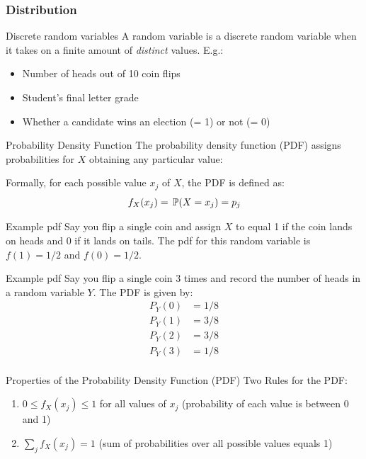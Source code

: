 \documentclass[aspectratio=169,t,11pt,table]{beamer}
\begin{document}
\subsubsection*{Distribution}

\begin{frame}{Discrete random variables}
  A random variable is a \alert{discrete random variable} when it takes on a finite amount of \emph{distinct} values. E.g.:
  \begin{itemize}
    \item Number of heads out of 10 coin flips
    
    \item Student's final letter grade

    \item Whether a candidate wins an election (= 1) or not (= 0)
  \end{itemize}
\end{frame}

\begin{frame}{Probability Density Function}
  The \alert{probability density function} (PDF) assigns probabilities for $X$ obtaining any particular value:
  
  \bigskip 
  Formally, for each possible value $x_j$ of $X$, the PDF is defined as:
  $$
    f_{X}(x_j) = \P{X = x_j} = p_j
  $$
\end{frame}

\begin{frame}{Example pdf}
  Say you flip a single coin and assign $X$ to equal 1 if the coin lands on heads and 0 if it lands on tails. 
  \bigskip
  The pdf for this random variable is $f(1) = 1/2$ and $f(0) = 1/2$.
\end{frame}

\begin{frame}{Example pdf}
  Say you flip a single coin 3 times and record the number of heads in a random variable $Y$. The PDF is given by:
  \begin{align*}
    P_Y(0) &= 1/8 \\
    P_Y(1) &= 3/8 \\
    P_Y(2) &= 3/8 \\
    P_Y(3) &= 1/8 \\
  \end{align*}
\end{frame}

\begin{frame}{Properties of the Probability Density Function (PDF)}
  Two Rules for the PDF:
  \begin{enumerate}
    \item $0 \leq f_{X}(x_j) \leq 1$ for all values of $x_j$ (probability of each value is between 0 and 1)
  
    \pause
    \item $\sum_{j} f_{X}(x_j) = 1$ (sum of probabilities over all possible values equals 1)
  \end{enumerate}
\end{frame}
\end{document}
